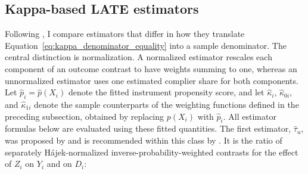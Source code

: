 \documentclass[12pt, a4paper, oneside]{article}
\theoremstyle{plain}
\theoremstyle{definition}
\begin{document}
\subsection{Kappa-based LATE estimators}
Following \citet[Section~3]{sloczynski2025abadie}, I compare estimators that
differ in how they translate Equation~\eqref{eq:kappa_denominator_equality} into
a sample denominator. The central distinction is normalization. A normalized
estimator rescales each component of an outcome contrast to have weights summing
to one, whereas an unnormalized estimator uses one estimated complier share for both
components. Let $\hat p_i=\hat p(X_i)$ denote the fitted instrument propensity score, and let
$\hat\kappa_i$, $\hat\kappa_{0i}$, and $\hat\kappa_{1i}$ denote the sample
counterparts of the weighting functions defined in the preceding subsection,
obtained by replacing $p(X_i)$ with $\hat p_i$. All estimator formulas below
are evaluated using these fitted quantities.
The first estimator,
$\hat\tau_u$, was proposed by \citet{uysal2011three} and is recommended within
this class by \citet[Section~3.1]{sloczynski2025abadie}. It is the ratio of
separately Hájek-normalized inverse-probability-weighted contrasts for the
effect of $Z_i$ on $Y_i$ and on $D_i$:
\end{document}
